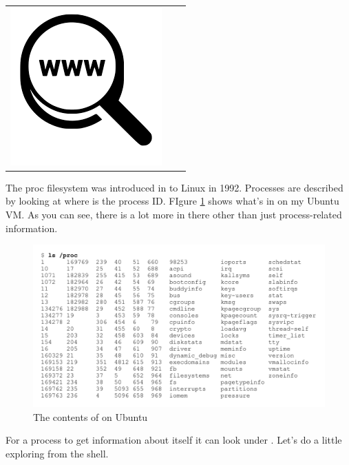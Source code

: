 \begin{table}[h]
\begin{tabular}{lcl}
\parbox[r]{0.5in}{ \includegraphics[scale=0.15]{figures/url.png}} & \parbox[l]{0.1in}{} & \parbox[l]{3in}{}
\end{tabular}
\end{table}

The proc filesystem was introduced in to Linux in 1992. Processes are described by looking at  where  is the process ID. FIgure \ref{fig:ls-proc} shows what's in  on my Ubuntu VM. As you can see, there is a lot more  in there other than just process-related information.

\begin{figure}
	\includegraphics[scale=0.68]{figures/ls-proc.pdf}
	\centering
	\caption{The contents of  on Ubuntu}
	\label{fig:ls-proc}
\end{figure}

For a process to get information about itself it can look under . Let's do a little exploring from the shell.

